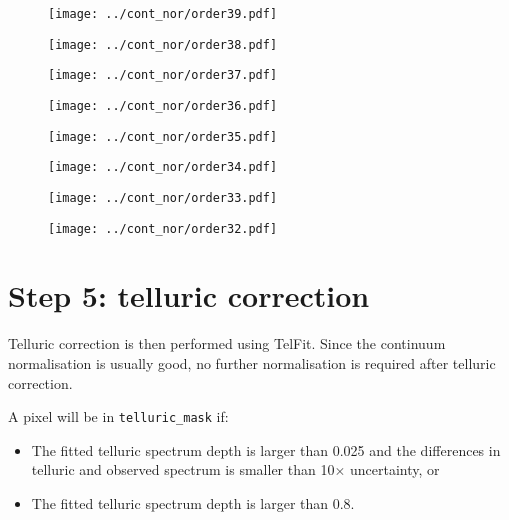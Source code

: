 \documentclass{article}
\begin{document}
\begin{figure}[H]
    \centering
    \texttt{[image: ../cont\_nor/order39.pdf]}
\end{figure}
\begin{figure}[H]
    \centering
    \texttt{[image: ../cont\_nor/order38.pdf]}
\end{figure}
\begin{figure}[H]
    \centering
    \texttt{[image: ../cont\_nor/order37.pdf]}
\end{figure}
\begin{figure}[H]
    \centering
    \texttt{[image: ../cont\_nor/order36.pdf]}
\end{figure}
\begin{figure}[H]
    \centering
    \texttt{[image: ../cont\_nor/order35.pdf]}
\end{figure}
\begin{figure}[H]
    \centering
    \texttt{[image: ../cont\_nor/order34.pdf]}
\end{figure}
\begin{figure}[H]
    \centering
    \texttt{[image: ../cont\_nor/order33.pdf]}
\end{figure}
\begin{figure}[H]
    \centering
    \texttt{[image: ../cont\_nor/order32.pdf]}
\end{figure}

\newpage

\section{Step 5: telluric correction}
\label{sec:telluric_correction}

Telluric correction is then performed using TelFit. 
Since the continuum normalisation is usually good, no further normalisation is required after telluric correction. 

A pixel will be in \texttt{telluric\_mask} if:

\begin{itemize}
    \item The fitted telluric spectrum depth is larger than 0.025 and the differences in telluric and observed spectrum is smaller than 10$\times$ uncertainty, or
    \item The fitted telluric spectrum depth is larger than 0.8.
\end {itemize}
\end{document}
